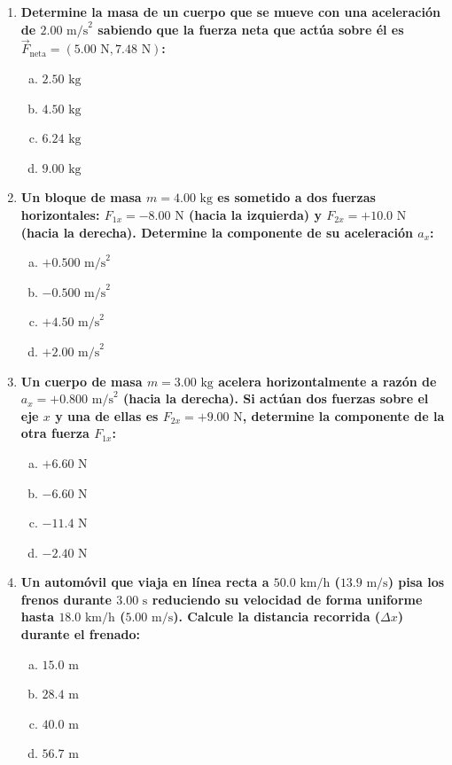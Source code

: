 \documentclass[11pt,a4paper]{article}
\begin{document}
\begin{enumerate}
    \item \textbf{Determine la masa de un cuerpo que se mueve con una aceleración de $2.00 \text{ m/s}^2$ sabiendo que la fuerza neta que actúa sobre él es $\vec{F}_{\text{neta}} = (5.00 \text{ N}, 7.48 \text{ N})$:}
    \begin{enumerate}[a)]
        \item $2.50 \text{ kg}$
        \item $4.50 \text{ kg}$
        \item $6.24 \text{ kg}$
        \item $9.00 \text{ kg}$
    \end{enumerate}

    \item \textbf{Un bloque de masa $m = 4.00 \text{ kg}$ es sometido a dos fuerzas horizontales: $F_{1x} = -8.00 \text{ N}$ (hacia la izquierda) y $F_{2x} = +10.0 \text{ N}$ (hacia la derecha). Determine la componente de su aceleración $a_x$:}
    \begin{enumerate}[a)]
        \item $+0.500 \text{ m/s}^2$
        \item $-0.500 \text{ m/s}^2$
        \item $+4.50 \text{ m/s}^2$
        \item $+2.00 \text{ m/s}^2$
    \end{enumerate}

    \item \textbf{Un cuerpo de masa $m = 3.00 \text{ kg}$ acelera horizontalmente a razón de $a_x = +0.800 \text{ m/s}^2$ (hacia la derecha). Si actúan dos fuerzas sobre el eje $x$ y una de ellas es $F_{2x} = +9.00 \text{ N}$, determine la componente de la otra fuerza $F_{1x}$:}
    \begin{enumerate}[a)]
        \item $+6.60 \text{ N}$
        \item $-6.60 \text{ N}$
        \item $-11.4 \text{ N}$
        \item $-2.40 \text{ N}$
    \end{enumerate}

    \item \textbf{Un automóvil que viaja en línea recta a $50.0 \text{ km/h}$ ($13.9 \text{ m/s}$) pisa los frenos durante $3.00 \text{ s}$ reduciendo su velocidad de forma uniforme hasta $18.0 \text{ km/h}$ ($5.00 \text{ m/s}$). Calcule la distancia recorrida ($\Delta x$) durante el frenado:}
    \begin{enumerate}[a)]
        \item $15.0 \text{ m}$
        \item $28.4 \text{ m}$
        \item $40.0 \text{ m}$
        \item $56.7 \text{ m}$
    \end{enumerate}


\end{enumerate}
\end{document}
